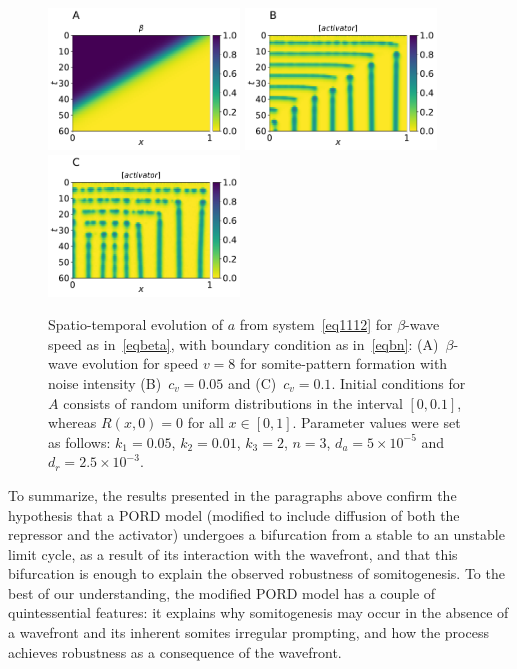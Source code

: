 \documentclass[11pt]{article}
\begin{document}
	\begin{figure}[t!]
		\centering
		\includegraphics[width=2in]{Figures/Fig05aRev.pdf}
		\includegraphics[width=2in]{Figures/Fig05bRev.pdf} 
		\includegraphics[width=2in]{Figures/Fig05cRev.pdf} 
		\caption{Spatio-temporal evolution of $a$ from system~\eqref{eq1112} for
			$\beta$-wave speed as in~\eqref{eqbeta}, with boundary condition as
			in~\eqref{eqbn}: (A)~$\beta$-wave evolution for speed $v=8$ for somite-pattern
			formation with noise intensity (B)~$c_v=0.05$ and (C)~$c_v=0.1$. Initial
			conditions for $A$ consists of random uniform distributions in the interval $[0,
			0.1]$, whereas $R(x, 0) = 0$ for all $x\in[0,1]$. Parameter values were set as
			follows: $k_1=0.05$, $k_2=0.01$, $k_3=2$, $n=3$,  $d_a = 5\times10^{-5}$
			and~$d_r=2.5\times10^{-3}$.}
		\label{Fig05}
	\end{figure}
	
	To summarize, the results presented in the paragraphs above confirm the
	hypothesis that a PORD model (modified to include diffusion of both the
	repressor and the activator) undergoes a bifurcation from a stable to an 
	unstable limit cycle, as a result of its interaction with the
	wavefront, and
	that this bifurcation is enough to explain the observed robustness of
	somitogenesis. To the best of our understanding, the modified PORD model has
	a couple of quintessential features: it
	explains why somitogenesis may occur in the absence of a wavefront and its
	inherent somites irregular prompting, and how the process achieves robustness as
	a consequence of the wavefront.
	
\end{document}
